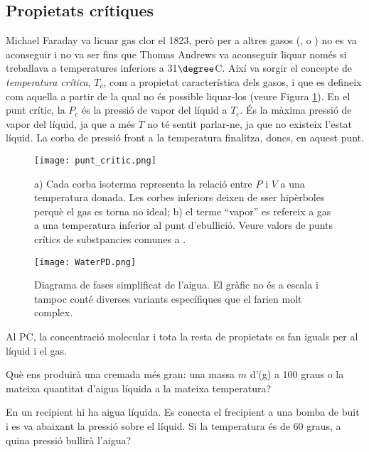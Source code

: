 \subsection{Propietats crítiques}
\label{sec:PropietatsCritiques}

Michael Faraday va licuar gas clor el 1823, però per a altres gasos (,  o ) no es va aconseguir i no va ser fins que Thomas Andrews va aconseguir liquar  només si treballava a temperatures inferiors a 31$\degree$C. Així va sorgir el concepte de \emph{temperatura crítica}, $T_c$, com a propietat característica dels gasos, i que es defineix com aquella a partir de la qual no és possible liquar-los (veure Figura \ref{fig:punt_critic}).
En el punt crític, la $P_c$ és la pressió de vapor del líquid a $T_c$. És la màxima pressió de vapor del líquid, ja que a més $T$ no té sentit parlar-ne, ja que no existeix l'estat líquid. La corba de pressió front a la temperatura finalitza, doncs, en aquest punt.

\begin{figure}[h]
\centering
\texttt{[image: punt\_critic.png]}
\caption[Punt crític]{a) Cada corba isoterma representa la relació entre $P$ i $V$ a una temperatura donada. Les corbes inferiors deixen de sser hipèrboles perquè el gas es torna no ideal; b) el terme ``vapor'' es refereix a gas a una temperatura inferior al punt d'ebullició. Veure valors de punts crítics de substpancies comunes a .\citep{openstax_cnx_openstax_nodate}}
\label{fig:punt_critic}
\end{figure}


\begin{figure}[h]
\centering
\texttt{[image: WaterPD.png]}
\caption[Diagrama de fases simplificat de l'aigua]{Diagrama de fases simplificat de l'aigua. El gràfic no és a escala i tampoc conté diverses variants específiques que el farien molt complex.\citep{openstax_cnx_openstax_nodate}}
\label{fig:WaterPD}
\end{figure}
Al PC, la concentració molecular i tota la resta de propietats es fan iguals per al líquid i el gas.

\begin{exr}
Què ens produirà una cremada més gran: una massa $m$ d'(g) a 100 graus o la mateixa quantitat d'aigua líquida a la mateixa temperatura?
\end{exr}

\begin{exr}
En un recipient hi ha aigua líquida. Es conecta el frecipient a una bomba de buit i es va abaixant la pressió sobre el líquid. Si la temperatura és de 60 graus, a quina pressió bullirà l'aigua?
\end{exr}

